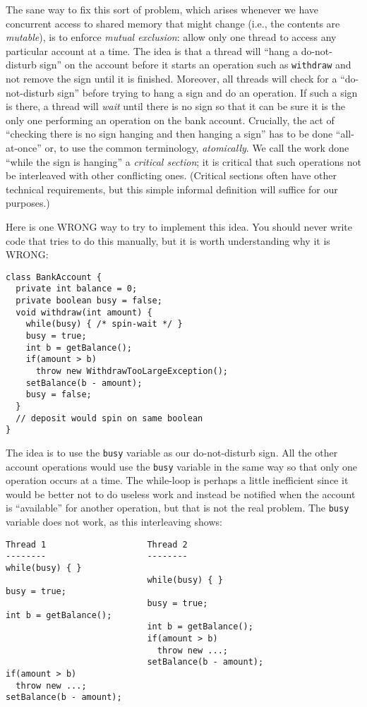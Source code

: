 \documentclass[10pt]{article}
\begin{document}
The sane way to fix this sort of problem, which arises whenever we
have concurrent access to shared memory that might change (i.e., the
contents are \emph{mutable}), is to enforce \emph{mutual exclusion}:
allow only one thread to access any particular account at a time.  The
idea is that a thread will ``hang a do-not-disturb sign'' on the
account before it starts an operation such as {\tt withdraw} and not
remove the sign until it is finished.  Moreover, all threads will
check for a ``do-not-disturb sign'' before trying to hang a sign and
do an operation.  If such a sign is there, a thread will \emph{wait}
until there is no sign so that it can be sure it is the only one
performing an operation on the bank account.  Crucially, the act of
``checking there is no sign hanging and then hanging a sign'' has to
be done ``all-at-once'' or, to use the common terminology,
\emph{atomically}.  We call the work done
``while the sign is hanging'' a \emph{critical section}; it is
critical that such operations not be interleaved with other
conflicting ones.  (Critical sections often have other technical
requirements, but this simple informal definition will suffice for our
purposes.)

Here is one WRONG way to try to implement this idea.  You should never
write code that tries to do this manually, but it is worth
understanding why it is WRONG:
\begin{verbatim}
class BankAccount {
  private int balance = 0;
  private boolean busy = false;
  void withdraw(int amount) {
    while(busy) { /* spin-wait */ }
    busy = true;
    int b = getBalance();
    if(amount > b)
      throw new WithdrawTooLargeException();
    setBalance(b - amount);
    busy = false;
  }
  // deposit would spin on same boolean
}
\end{verbatim}
The idea is to use the {\tt busy} variable as our do-not-disturb
sign.  All the other account operations would use the {\tt busy}
variable in the same way so that only one operation occurs at a time.
The while-loop is perhaps a little inefficient since it would be
better not to do useless work and instead be notified when the account
is ``available'' for another operation, but that is not the real
problem.  The {\tt busy} variable does not work, as this interleaving
shows:
\begin{verbatim}
Thread 1                    Thread 2
--------                    --------
while(busy) { }
                            while(busy) { }
busy = true;
                            busy = true;
int b = getBalance();
                            int b = getBalance();
                            if(amount > b)
                              throw new ...;
                            setBalance(b - amount);
if(amount > b)
  throw new ...;
setBalance(b - amount);
\end{verbatim}
\end{document}
